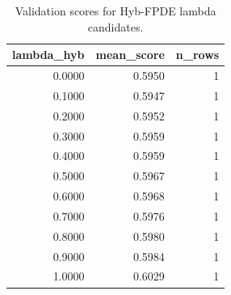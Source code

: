 \begin{table}[t]
\caption{Validation scores for Hyb-FPDE lambda candidates.}
\label{tab:lambda_distribution_computed}
\centering
\begin{tabular}{rrr}
\toprule
lambda\_hyb & mean\_score & n\_rows \\
\midrule
0.0000 & 0.5950 & 1 \\
0.1000 & 0.5947 & 1 \\
0.2000 & 0.5952 & 1 \\
0.3000 & 0.5959 & 1 \\
0.4000 & 0.5959 & 1 \\
0.5000 & 0.5967 & 1 \\
0.6000 & 0.5968 & 1 \\
0.7000 & 0.5976 & 1 \\
0.8000 & 0.5980 & 1 \\
0.9000 & 0.5984 & 1 \\
1.0000 & 0.6029 & 1 \\
\bottomrule
\end{tabular}

\end{table}
